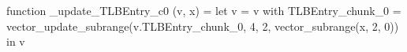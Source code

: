 function _update_TLBEntry_c0 (v, x) = let v = { v with TLBEntry_chunk_0 = vector_update_subrange(v.TLBEntry_chunk_0, 4, 2, vector_subrange(x, 2, 0)) } in v
